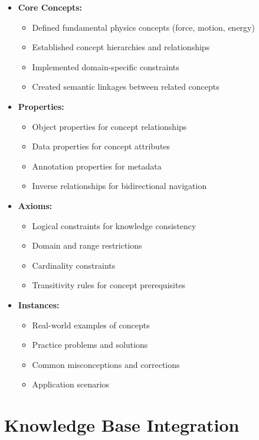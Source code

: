 \begin{itemize}
  \item \textbf{Core Concepts:} 
    \begin{itemize}
      \item Defined fundamental physics concepts (force, motion, energy)
      \item Established concept hierarchies and relationships
      \item Implemented domain-specific constraints
      \item Created semantic linkages between related concepts
    \end{itemize}
  
  \item \textbf{Properties:} 
    \begin{itemize}
      \item Object properties for concept relationships
      \item Data properties for concept attributes
      \item Annotation properties for metadata
      \item Inverse relationships for bidirectional navigation
    \end{itemize}
  
  \item \textbf{Axioms:} 
    \begin{itemize}
      \item Logical constraints for knowledge consistency
      \item Domain and range restrictions
      \item Cardinality constraints
      \item Transitivity rules for concept prerequisites
    \end{itemize}
  
  \item \textbf{Instances:} 
    \begin{itemize}
      \item Real-world examples of concepts
      \item Practice problems and solutions
      \item Common misconceptions and corrections
      \item Application scenarios
    \end{itemize}
\end{itemize}

\section{Knowledge Base Integration}
\label{sec:kb-integration}

